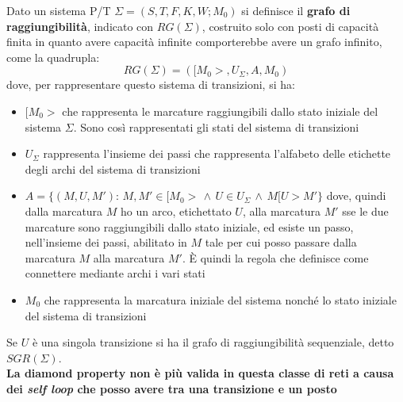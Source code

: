 \documentclass[a4paper,12pt, oneside]{book}
\begin{document}
\begin{definizione}
  Dato un sistema P/T $\Sigma=(S, T , F , K , W;M_0)$ si definisce il
  \textbf{grafo di raggiungibilità}, indicato con
  $RG(\Sigma)$, costruito solo con posti di capacità finita in quanto avere
  capacità infinite comporterebbe avere un grafo infinito, come la quadrupla:
  \[RG(\Sigma)=([M_0 >, U_\Sigma , A, M_0 )\]
  dove, per rappresentare questo sistema di transizioni, si ha:
  \begin{itemize}
    \item $[M_0>$ che rappresenta le marcature raggiungibili dallo stato iniziale
    del sistema $\Sigma$. Sono così rappresentati gli stati del sistema di
    transizioni  
    \item $U_\Sigma$ rappresenta l'insieme dei passi che rappresenta l'alfabeto
    delle etichette degli archi
    del sistema di transizioni
    \item $A=\{(M,U,M'):\,M,M'\in [M_0>\,\wedge\, U\in U_\Sigma \,\wedge\,
    M[U>M'\}$ dove, quindi dalla marcatura $M$ ho un arco, etichettato $U$, alla
    marcatura $M'$ sse le due marcature sono raggiungibili dallo stato iniziale,
    ed esiste un passo, nell'insieme dei passi, abilitato in $M$ tale per cui
    posso passare dalla marcatura $M$ alla marcatura $M'$. È quindi la regola
    che definisce come connettere mediante archi i vari stati
    \item $M_0$ che rappresenta la marcatura iniziale del sistema nonché lo
    stato iniziale del sistema di transizioni
  \end{itemize}
  Se $U$ è una singola transizione si ha il grafo di raggiungibilità
  sequenziale, detto $SGR(\Sigma)$.\\
  \textbf{La diamond property non è più valida in questa classe di reti a causa
    dei \emph{self loop} che posso avere tra una transizione e un posto}
\end{definizione}
\end{document}
